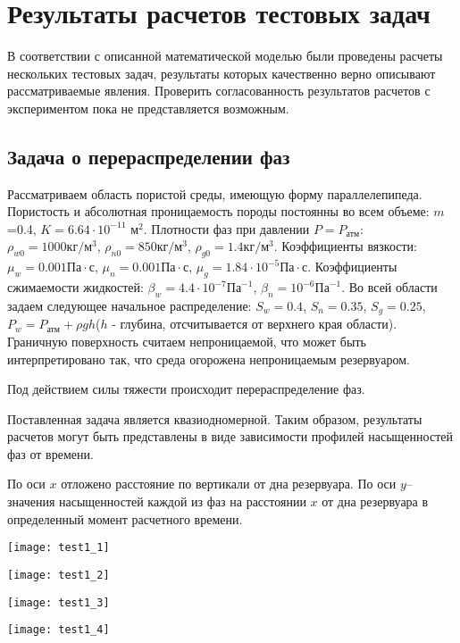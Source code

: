 %
\section{Результаты расчетов тестовых задач}
%
В соответствии с описанной математической моделью были проведены расчеты
нескольких тестовых задач, результаты которых качественно верно описывают
рассматриваемые явления. Проверить согласованность результатов расчетов с
экспериментом пока не представляется возможным.

\subsection{Задача о перераспределении фаз}
Рассматриваем область пористой среды, имеющую форму параллелепипеда. Пористость и
абсолютная проницаемость породы постоянны во всем объеме:  $m$=0.4,\; $K=6.64\cdot 10^{-11}$ м$^2$.
Плотности фаз при давлении $P=P_\text{атм}$:\; $\rho_{w0}=1000 \text{кг}/\text{м}^3$,\; 
$\rho_{n0}=850 \text{кг}/\text{м}^3$,\;
$\rho_{g0}=1.4 \text{кг}/\text{м}^3$. 
Коэффициенты вязкости:\; $\mu_w=0.001 \text{Па}\cdot \text{с}$,\;
$\mu_n=0.001 \text{Па}\cdot \text{с}$,\; $\mu_g=1.84\cdot 10^{-5} \text{Па}\cdot \text{с}$.
Коэффициенты сжимаемости жидкостей:\; $\beta_w=4.4\cdot 10^{-7} \text{Па}^{-1}$,\;
$\beta_n=10^{-6} \text{Па}^{-1}$. Во всей области задаем следующее 
начальное распределение:\; $S_w=0.4$,\; $S_n=0.35$,\; $S_g=0.25$, 
$P_w=P_\text{атм}+\rho g h$($h$ - глубина, отсчитывается от верхнего края области). 
Граничную поверхность считаем непроницаемой, что может быть интерпретировано так,
что среда огорожена непроницаемым резервуаром. 

Под действием силы тяжести происходит перераспределение фаз.

Поставленная задача является квазиодномерной. Таким образом, результаты расчетов
могут быть представлены в виде зависимости профилей насыщенностей фаз от времени.

По оси $x$ отложено расстояние по вертикали от дна резервуара. По оси $y$--
значения насыщенностей каждой из фаз на расстоянии $x$ от дна резервуара
в определенный момент расчетного времени. 

\begin{center}
 \texttt{[image: test1\_1]}
\end{center}
\begin{center}
 \texttt{[image: test1\_2]}
\end{center}
\begin{center}
 \texttt{[image: test1\_3]}
\end{center}
\begin{center}
 \texttt{[image: test1\_4]}
\end{center}

